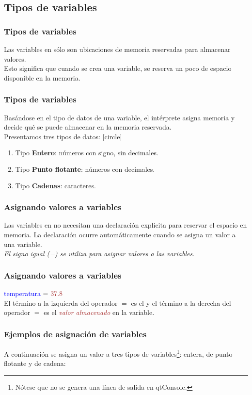 \documentclass[12pt]{beamer}
\begin{document}
{\subsection{Tipos de variables}
\begin{frame}
\frametitle{Tipos de variables}
Las variables en \python{} sólo son ubicaciones de memoria reservadas para almacenar valores.
\\
\bigskip
Esto significa que cuando se crea una variable, se reserva un poco de espacio disponible en la memoria.
\end{frame}
\begin{frame}
\frametitle{Tipos de variables}
Basándose en el tipo de datos de una variable, el intérprete asigna memoria y decide qué se puede almacenar en la memoria reservada.
\\
\bigskip
Presentamos tres tipos de datos:
[circle]
\begin{enumerate}[<+->]
\item Tipo \textbf{Entero}: números con signo, sin decimales.
\item Tipo \textbf{Punto flotante}: números con decimales.
\item Tipo \textbf{Cadenas}: caracteres.
\end{enumerate}
\end{frame}
\begin{frame}
\frametitle{Asignando valores a variables}
Las variables en \python{} no necesitan una declaración explícita para reservar el espacio en memoria. La declaración ocurre automáticamente cuando se asigna un valor a una variable.
\\
\bigskip
\pause
\emph{El signo igual (=) se utiliza para asignar valores a las variables}.
\end{frame}
\begin{frame}[fragile]
\frametitle{Asignando valores a variables}
\textcolor{blue}{temperatura} = \textcolor{brown}{37.8}
\\
\bigskip
El término a la izquierda del operador $=$ es el  y el término a la derecha del operador $=$ es el \textcolor{brown}{\emph{valor almacenado}} en la variable.
\end{frame}
\begin{frame}[fragile]
\frametitle{Ejemplos de asignación de variables}
A continuación se asigna un valor a tres tipos de variables\footnote{Nótese que no se genera una línea de salida en qtConsole.}: entera, de punto flotante y de cadena:

\end{frame}}
\end{document}
